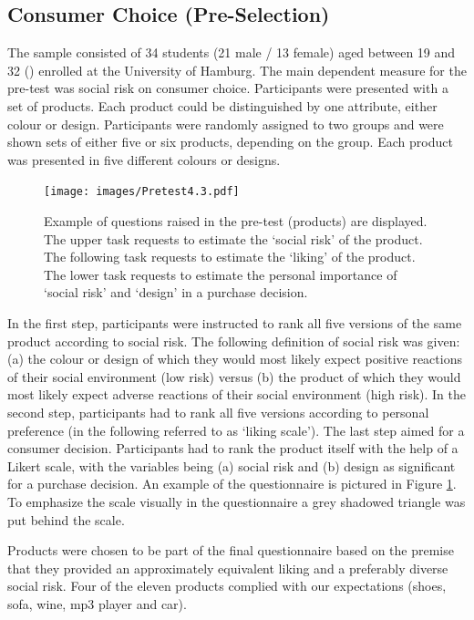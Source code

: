 \subsection{Consumer Choice (Pre-Selection)}\label{sec:consumerchoice}
The sample consisted of 34 students (21 male / 13 female) aged between 19 and 32 () enrolled at the University of Hamburg. The main dependent measure for the pre-test was social risk on consumer choice. Participants were presented with a set of products. Each product could be distinguished by one attribute, either colour or design. Participants were randomly assigned to two groups and were shown sets of either five or six products, depending on the group. Each product was presented in five different colours or designs. \par
\begin{figure}[h!]
\center
		\texttt{[image: images/Pretest4.3.pdf]}
  \caption{Example of questions raised in the pre-test (products) are displayed. The upper task requests to estimate the ‘social risk’ of the product. The following task requests to estimate the ‘liking’ of the product. The lower task requests to estimate the personal importance of ‘social risk’ and ‘design’ in a purchase decision.}\label{fig:pretest_sample_shoes}
\end{figure}
In the first step, participants were instructed to rank all five versions of the same product according to social risk. The following definition of social risk was given: (a) the colour or design of which they would most likely expect positive reactions of their social environment (low risk) versus (b) the product of which they would most likely expect adverse reactions of their social environment (high risk). In the second step, participants had to rank all five versions according to personal preference (in the following referred to as ‘liking scale’). The last step aimed for a consumer decision. Participants had to rank the product itself with the help of a Likert scale, with the variables being (a) social risk and (b) design as significant for a purchase decision. An example of the questionnaire is pictured in Figure \ref{fig:pretest_sample_shoes}. To emphasize the scale visually in the questionnaire a grey shadowed triangle was put behind the scale.\par
Products were chosen to be part of the final questionnaire based on the premise that they provided an approximately equivalent liking and a preferably diverse social risk. Four of the eleven products complied with our expectations (shoes, sofa, wine, mp3 player and car). \par

